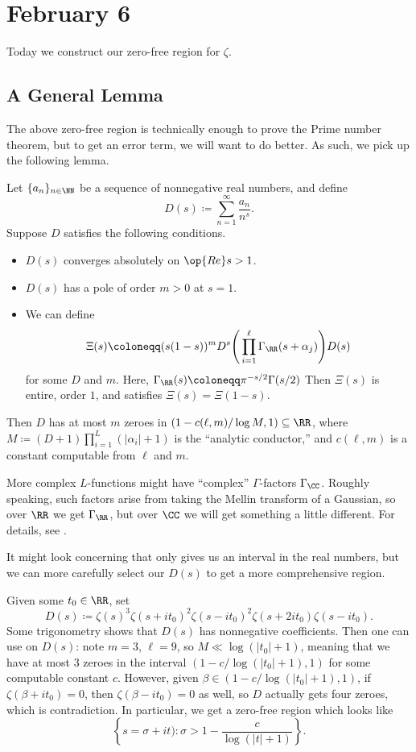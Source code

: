 \documentclass[../notes.tex]{subfiles}
\begin{document}
\section{February 6}

Today we construct our zero-free region for $\zeta$.

\subsection{A General Lemma}
The above zero-free region is technically enough to prove the Prime number theorem, but to get an error term, we will want to do better. As such, we pick up the following lemma.
\begin{lemma} \label{lem:zero-free-region}
	Let $\{a_n\}_{n\in\NN}$ be a sequence of nonnegative real numbers, and define
	\[D(s)\coloneqq\sum_{n=1}^\infty\frac{a_n}{n^s}.\]
	Suppose $D$ satisfies the following conditions.
	\begin{itemize}
		\item $D(s)$ converges absolutely on $\op{Re}s>1$.
		\item $D(s)$ has a pole of order $m>0$ at $s=1$.
		\item We can define
		\[\Xi(s)\coloneqq(s(1-s))^mD^s\Bigg(\prod_{i=1}^\ell\Gamma_\RR(s+\alpha_j)\Bigg)D(s)\]
		for some $D$ and $m$. Here, $\Gamma_\RR(s)\coloneqq\pi^{-s/2}\Gamma(s/2)$ Then $\Xi(s)$ is entire, order $1$, and satisfies $\Xi(s)=\Xi(1-s)$.
	\end{itemize}
	Then $D$ has at most $m$ zeroes in $(1-c(\ell,m)/\log M,1)\subseteq\RR$, where $M\coloneqq(D+1)\prod_{i=1}^L(|\alpha_i|+1)$ is the ``analytic conductor,'' and $c(\ell,m)$ is a constant computable from $\ell$ and $m$.
\end{lemma}
\begin{remark}
	More complex $L$-functions might have ``complex'' $\Gamma$-factors $\Gamma_\CC$. Roughly speaking, such factors arise from taking the Mellin transform of a Gaussian, so over $\RR$ we get $\Gamma_\RR$, but over $\CC$ we will get something a little different. For details, see \cite{tate-thesis}.
\end{remark}
It might look concerning that  only gives us an interval in the real numbers, but we can more carefully select our $D(s)$ to get a more comprehensive region.
\begin{example} \label{ex:zeta-zero-free-region}
	Given some $t_0\in\RR$, set
	\[D(s)\coloneqq\zeta(s)^3\zeta(s+it_0)^2\zeta(s-it_0)^2\zeta(s+2it_0)\zeta(s-it_0).\]
	Some trigonometry shows that $D(s)$ has nonnegative coefficients. Then one can use  on $D(s)$: note $m=3$, $\ell=9$, so $M\ll\log(|t_0|+1)$, meaning that we have at most $3$ zeroes in the interval $(1-c/\log(|t_0|+1),1)$ for some computable constant $c$. However, given $\beta\in(1-c/\log(|t_0|+1),1)$, if $\zeta(\beta+it_0)=0$, then $\zeta(\beta-it_0)=0$ as well, so $D$ actually gets four zeroes, which is contradiction. In particular, we get a zero-free region which looks like
	\[\left\{s=\sigma+it):\sigma>1-\frac c{\log(|t|+1)}\right\}.\]
\end{example}
\end{document}
